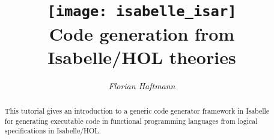 \documentclass[12pt,a4paper,fleqn]{article}
\title{\texttt{[image: isabelle\_isar]}
  \\[4ex] Code generation from Isabelle/HOL theories}
\author{\emph{Florian Haftmann}}
\begin{document}
\maketitle

\begin{abstract}
  \noindent This tutorial gives an introduction to a generic code generator framework in Isabelle
  for generating executable code in functional programming languages from logical
  specifications in Isabelle/HOL.
\end{abstract}

\thispagestyle{empty}\clearpage

\clearfirst







\begingroup
 \small\raggedright\frenchspacing

\endgroup
\end{document}
